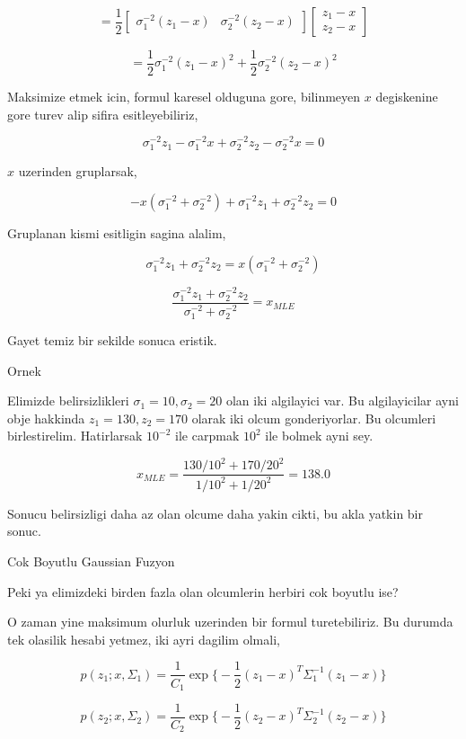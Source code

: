 \documentclass[12pt,fleqn]{article}\usepackage{../common}
\begin{document}
$$ = \frac{1}{2}  
\left[\begin{array}{cc}
\sigma_1^{-2}(z_1-x) & \sigma_2^{-2} (z_2-x)
\end{array}\right]
\left[\begin{array}{c}
z_1-x \\ z_2-x
\end{array}\right]
$$

$$ = 
\frac{1}{2}\sigma_1^{-2}(z_1-x)^2 + \frac{1}{2}\sigma_2^{-2} (z_2-x)^2
$$

Maksimize etmek icin, formul karesel olduguna gore, bilinmeyen $x$
degiskenine gore turev alip sifira esitleyebiliriz,

$$ 
\sigma_1^{-2}z_1-\sigma_1^{-2}x + \sigma_2^{-2}z_2-\sigma_2^{-2}x = 0
$$

$x$ uzerinden gruplarsak,

$$ 
-x(\sigma_1^{-2}+\sigma_2^{-2}) + \sigma_1^{-2}z_1+ \sigma_2^{-2}z_2 = 0
$$

Gruplanan kismi esitligin sagina alalim,

$$ 
\sigma_1^{-2}z_1+ \sigma_2^{-2}z_2 = x(\sigma_1^{-2}+\sigma_2^{-2}) 
$$

$$ 
\frac{\sigma_1^{-2}z_1+ \sigma_2^{-2}z_2 }{\sigma_1^{-2}+\sigma_2^{-2}}= x_{MLE}
$$

Gayet temiz bir sekilde sonuca eristik. 

Ornek

Elimizde belirsizlikleri $\sigma_1=10,\sigma_2=20$ olan iki algilayici
var. Bu algilayicilar ayni obje hakkinda $z_1=130,z_2=170$ olarak iki olcum
gonderiyorlar. Bu olcumleri birlestirelim. Hatirlarsak $10^{-2}$ ile
carpmak $10^{2}$ ile bolmek ayni sey.

$$ x_{MLE} =
\frac{130/10^2 + 170/20^2}{1/10^2 + 1/20^2} = 138.0
$$

Sonucu belirsizligi daha az olan olcume daha yakin cikti, bu akla yatkin
bir sonuc.

Cok Boyutlu Gaussian Fuzyon

Peki ya elimizdeki birden fazla olan olcumlerin herbiri cok boyutlu ise? 

O zaman yine maksimum olurluk uzerinden bir formul turetebiliriz. Bu
durumda tek olasilik hesabi yetmez, iki ayri dagilim olmali,

$$ p(z_1;x,\Sigma_1) =  \frac{ 1}{C_1} \exp 
\bigg\{ 
-\frac{ 1}{2}(z_1-x)^T\Sigma_1^{-1}(z_1-x)
\bigg\} $$

$$ p(z_2;x,\Sigma_2) =  \frac{ 1}{C_2} \exp 
\bigg\{ 
-\frac{ 1}{2}(z_2-x)^T\Sigma_2^{-1}(z_2-x)
\bigg\} $$
\end{document}
